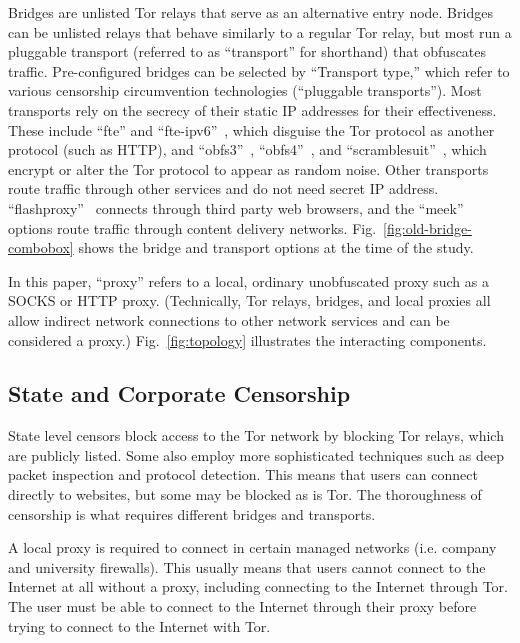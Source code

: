 \documentclass[USenglish,oneside,twocolumn]{article}
\begin{document}
Bridges are unlisted Tor relays that serve as an alternative entry node.
Bridges can be unlisted relays that behave similarly to a regular Tor relay,  
but most run a pluggable transport (referred to as ``transport'' for shorthand) that obfuscates traffic. 
Pre-configured bridges can be selected by ``Transport type,'' which refer to various
censorship circumvention technologies (``pluggable transports'').
Most transports rely on the secrecy of their static IP addresses for their effectiveness.
These include ``fte'' and ``fte-ipv6''~\cite{fte},
which disguise the Tor protocol as another protocol (such as HTTP), and
``obfs3''~\cite{obfs3}, ``obfs4''~\cite{obfs4}, and ``scramblesuit''~\cite{scramblesuit},
which encrypt or alter the Tor protocol to appear as random noise.
Other transports route traffic through other services and do not need secret IP address. 
``flashproxy''~\cite{flashproxy} connects through third party web browsers,
and the ``meek''~\cite{fifield2015blocking} options route traffic
through content delivery networks. Fig.~\ref{fig:old-bridge-combobox} shows the bridge and transport options at the time of the study.

In this paper, ``proxy'' refers to a local, ordinary unobfuscated proxy such as a SOCKS or HTTP proxy. (Technically, Tor relays, bridges, and local proxies all allow indirect network connections to other network services and can be considered a proxy.) Fig.~\ref{fig:topology} illustrates the interacting components.

\subsection{State and Corporate Censorship}
State level censors block access to the Tor network by blocking Tor relays, which are publicly listed. Some also employ more sophisticated techniques such as deep packet inspection and protocol detection. This means that users can connect directly to websites, but some may be blocked as is Tor. The thoroughness of censorship is what requires different bridges and transports. 

A local proxy is required to connect in certain managed networks (i.e. company and university firewalls). This usually means that users cannot connect to the Internet at all without a proxy, including connecting to the Internet through Tor. The user must be able to connect to the Internet through their proxy before trying to connect to the Internet with Tor. 
\end{document}
